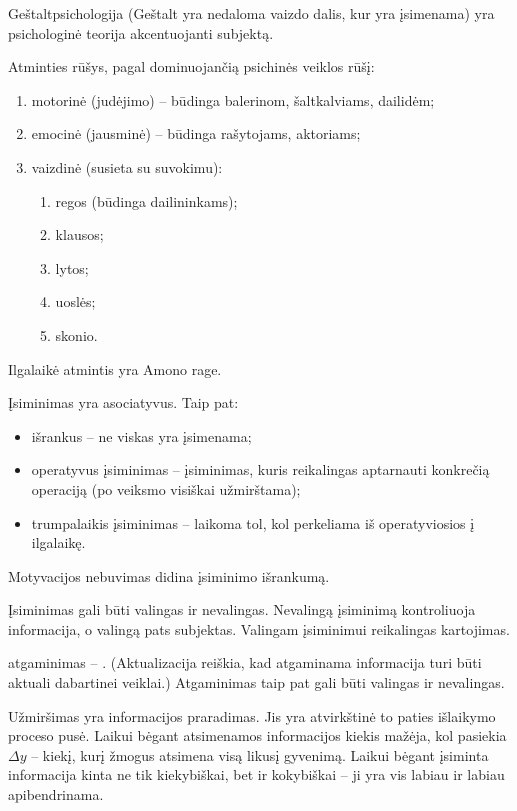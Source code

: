 Geštaltpsichologija (Geštalt yra nedaloma vaizdo dalis, kur yra įsimenama)
yra psichologinė teorija akcentuojanti subjektą.

Atminties rūšys, pagal dominuojančią psichinės veiklos rūšį:

\begin{enumerate}
  \item motorinė (judėjimo) – būdinga balerinom, šaltkalviams, dailidėm;
  \item emocinė (jausminė) – būdinga rašytojams, aktoriams;
  \item vaizdinė (susieta su suvokimu):
    \begin{enumerate}
      \item regos (būdinga dailininkams);
      \item klausos;
      \item lytos;
      \item uoslės;
      \item skonio.
    \end{enumerate}
\end{enumerate}

Ilgalaikė atmintis yra Amono rage.

Įsiminimas yra asociatyvus. Taip pat:

\begin{itemize}
  \item išrankus – ne viskas yra įsimenama;
  \item operatyvus įsiminimas – įsiminimas, kuris reikalingas aptarnauti 
    konkrečią operaciją (po veiksmo visiškai užmirštama);
  \item trumpalaikis įsiminimas – laikoma tol, kol perkeliama iš 
    operatyviosios į ilgalaikę.
\end{itemize}

Motyvacijos nebuvimas didina įsiminimo išrankumą.

Įsiminimas gali būti valingas ir nevalingas. Nevalingą įsiminimą 
kontroliuoja informacija, o valingą pats subjektas. Valingam įsiminimui
reikalingas kartojimas.

\Gls{atgaminimas} – . (Aktualizacija reiškia, kad
atgaminama informacija turi būti aktuali dabartinei veiklai.) Atgaminimas
taip pat gali būti valingas ir nevalingas.

Užmiršimas yra informacijos praradimas. Jis yra atvirkštinė to paties 
išlaikymo proceso pusė. Laikui bėgant atsimenamos informacijos kiekis
mažėja, kol pasiekia $\Delta y$ – kiekį, kurį žmogus atsimena visą likusį
gyvenimą. Laikui bėgant įsiminta informacija kinta ne tik kiekybiškai, bet
ir kokybiškai – ji yra vis labiau ir labiau apibendrinama.

